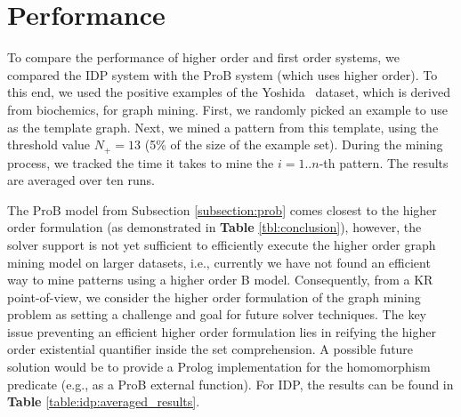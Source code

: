 \section{Performance}\label{sec:performance}
To compare the performance of higher order and first order systems, we compared the IDP system with the ProB system (which uses higher order).
To this end, we used the positive examples of the Yoshida~\citep{yoshida_dataset} dataset, which is derived from biochemics, for graph mining.
First, we randomly picked an example to use as the template graph.
Next, we mined a pattern from this template, using the threshold value $N_{+} = 13$ (5\% of the size of the example set).
During the mining process, we tracked the time it takes to mine the $i=1..n$-th pattern. The results are averaged over ten runs.


The ProB model from Subsection \ref{subsection:prob} comes closest to the higher order formulation (as demonstrated in \textbf{Table} \ref{tbl:conclusion}), however, the solver support is not yet sufficient to efficiently execute the higher order graph mining model on larger datasets, i.e., currently we have not found an efficient way to mine patterns using a higher order B model. 
Consequently, from a KR point-of-view, we consider the higher order formulation of the graph mining problem as setting a challenge and goal for future solver techniques.
The key issue preventing an efficient higher order formulation lies in reifying the higher order existential quantifier inside the set comprehension. A possible future solution would be to provide a Prolog implementation for the homomorphism predicate (e.g., as a ProB external function).
For IDP, the results can be found in \textbf{Table} \ref{table:idp:averaged_results}.

